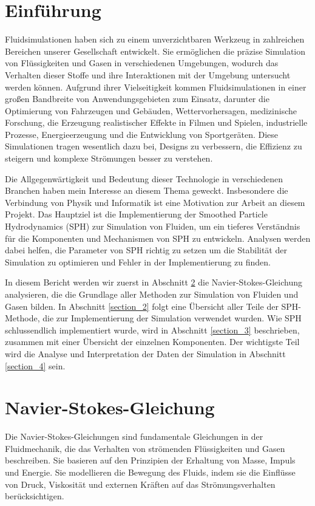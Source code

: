 \documentclass[a4paper, 12pt]{article}
\begin{document}
\makeTitleAndTable

\section{Einführung}
Fluidsimulationen haben sich zu einem unverzichtbaren Werkzeug in zahlreichen Bereichen unserer Gesellschaft entwickelt. Sie ermöglichen die präzise Simulation von Flüssigkeiten und Gasen in verschiedenen Umgebungen, wodurch das Verhalten dieser Stoffe und ihre Interaktionen mit der Umgebung untersucht werden können. Aufgrund ihrer Vielseitigkeit kommen Fluidsimulationen in einer großen Bandbreite von Anwendungsgebieten zum Einsatz, darunter die Optimierung von Fahrzeugen und Gebäuden, Wettervorhersagen, medizinische Forschung, die Erzeugung realistischer Effekte in Filmen und Spielen, industrielle Prozesse, Energieerzeugung und die Entwicklung von Sportgeräten. Diese Simulationen tragen wesentlich dazu bei, Designs zu verbessern, die Effizienz zu steigern und komplexe Strömungen besser zu verstehen.

Die Allgegenwärtigkeit und Bedeutung dieser Technologie in verschiedenen Branchen haben mein Interesse an diesem Thema geweckt. Insbesondere die Verbindung von Physik und Informatik ist eine Motivation zur Arbeit an diesem Projekt. Das Hauptziel ist die Implementierung der Smoothed Particle Hydrodynamics (SPH) zur Simulation von Fluiden, um ein tieferes Verständnis für die Komponenten und Mechanismen von SPH zu entwickeln. Analysen werden dabei helfen, die Parameter von SPH richtig zu setzen um die Stabilität der Simulation zu optimieren und Fehler in der Implementierung zu finden.

In diesem Bericht werden wir zuerst in Abschnitt \ref{section_1} die Navier-Stokes-Gleichung analysieren, die die Grundlage aller Methoden zur Simulation von Fluiden und Gasen bilden. In Abschnitt \ref{section_2} folgt eine Übersicht aller Teile der SPH-Methode, die zur Implementierung der Simulation verwendet wurden. Wie SPH schlussendlich implementiert wurde, wird in Abschnitt \ref{section_3} beschrieben, zusammen mit einer Übersicht der einzelnen Komponenten. Der wichtigste Teil wird die Analyse und Interpretation der Daten der Simulation in Abschnitt \ref{section_4} sein.

\section{Navier-Stokes-Gleichung} \label{section_1}
Die Navier-Stokes-Gleichungen sind fundamentale Gleichungen in der Fluidmechanik, die das Verhalten von strömenden Flüssigkeiten und Gasen beschreiben. Sie basieren auf den Prinzipien der Erhaltung von Masse, Impuls und Energie. Sie modellieren die Bewegung des Fluids, indem sie die Einflüsse von Druck, Viskosität und externen Kräften auf das Strömungsverhalten berücksichtigen.
\end{document}
